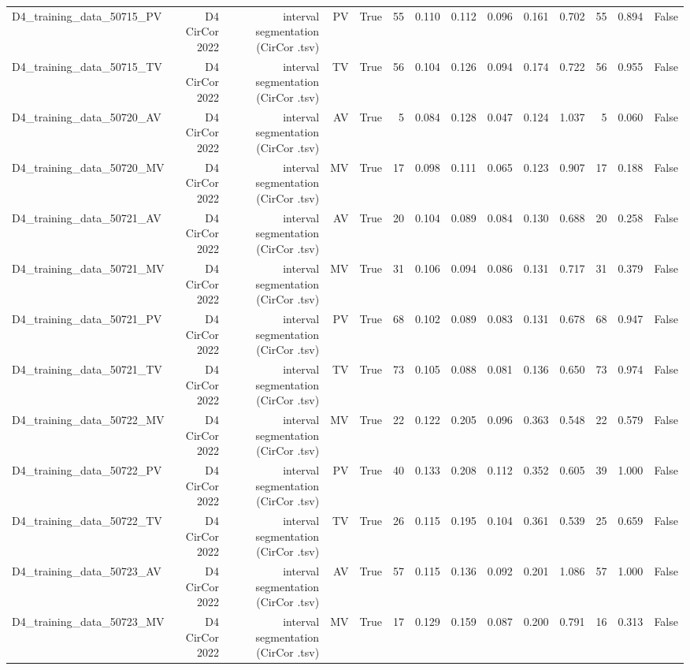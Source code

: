 \begin{table}[htbp]
\begin{tabular}{lrrrrrrrrrrrrr}
    D4\_training\_data\_50715\_PV & D4 CirCor 2022 & interval segmentation (CirCor .tsv) & PV & True & 55 & 0.110 & 0.112 & 0.096 & 0.161 & 0.702 & 55 & 0.894 & False \\
    D4\_training\_data\_50715\_TV & D4 CirCor 2022 & interval segmentation (CirCor .tsv) & TV & True & 56 & 0.104 & 0.126 & 0.094 & 0.174 & 0.722 & 56 & 0.955 & False \\
    D4\_training\_data\_50720\_AV & D4 CirCor 2022 & interval segmentation (CirCor .tsv) & AV & True & 5 & 0.084 & 0.128 & 0.047 & 0.124 & 1.037 & 5 & 0.060 & False \\
    D4\_training\_data\_50720\_MV & D4 CirCor 2022 & interval segmentation (CirCor .tsv) & MV & True & 17 & 0.098 & 0.111 & 0.065 & 0.123 & 0.907 & 17 & 0.188 & False \\
    D4\_training\_data\_50721\_AV & D4 CirCor 2022 & interval segmentation (CirCor .tsv) & AV & True & 20 & 0.104 & 0.089 & 0.084 & 0.130 & 0.688 & 20 & 0.258 & False \\
    D4\_training\_data\_50721\_MV & D4 CirCor 2022 & interval segmentation (CirCor .tsv) & MV & True & 31 & 0.106 & 0.094 & 0.086 & 0.131 & 0.717 & 31 & 0.379 & False \\
    D4\_training\_data\_50721\_PV & D4 CirCor 2022 & interval segmentation (CirCor .tsv) & PV & True & 68 & 0.102 & 0.089 & 0.083 & 0.131 & 0.678 & 68 & 0.947 & False \\
    D4\_training\_data\_50721\_TV & D4 CirCor 2022 & interval segmentation (CirCor .tsv) & TV & True & 73 & 0.105 & 0.088 & 0.081 & 0.136 & 0.650 & 73 & 0.974 & False \\
    D4\_training\_data\_50722\_MV & D4 CirCor 2022 & interval segmentation (CirCor .tsv) & MV & True & 22 & 0.122 & 0.205 & 0.096 & 0.363 & 0.548 & 22 & 0.579 & False \\
    D4\_training\_data\_50722\_PV & D4 CirCor 2022 & interval segmentation (CirCor .tsv) & PV & True & 40 & 0.133 & 0.208 & 0.112 & 0.352 & 0.605 & 39 & 1.000 & False \\
    D4\_training\_data\_50722\_TV & D4 CirCor 2022 & interval segmentation (CirCor .tsv) & TV & True & 26 & 0.115 & 0.195 & 0.104 & 0.361 & 0.539 & 25 & 0.659 & False \\
    D4\_training\_data\_50723\_AV & D4 CirCor 2022 & interval segmentation (CirCor .tsv) & AV & True & 57 & 0.115 & 0.136 & 0.092 & 0.201 & 1.086 & 57 & 1.000 & False \\
    D4\_training\_data\_50723\_MV & D4 CirCor 2022 & interval segmentation (CirCor .tsv) & MV & True & 17 & 0.129 & 0.159 & 0.087 & 0.200 & 0.791 & 16 & 0.313 & False \\

\end{tabular}
\end{table}
